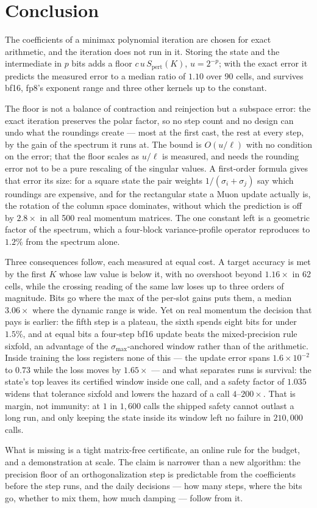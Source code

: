 \section{Conclusion}
\label{sec:conclusion}

The coefficients of a minimax polynomial iteration are chosen for exact arithmetic, and
the iteration does not run in it.  Storing the state and the intermediate in $p$ bits adds
a floor $c\,u\,S_{\mathrm{pert}}(K)$, $u=2^{-p}$; with the exact error it predicts the
measured error to a median ratio of $1.10$ over 90 cells, and survives bf16, fp8's
exponent range and three other kernels up to the constant.

The floor is not a balance of contraction and reinjection but a subspace error: the exact
iteration preserves the polar factor, so no step count and no design can undo what the
roundings create --- most at the first cast, the rest at every step, by the gain of the
spectrum it runs at.  The bound is $O(u/\ell)$ with no condition on the error; that the
floor scales as $u/\ell$ is measured, and needs the rounding error not to be a pure
rescaling of the singular values.  A first-order formula gives that error its size: for a square state the
pair weights $1/(\sigma_i+\sigma_j)$ say which roundings are expensive, and for the
rectangular state a Muon update actually is, the rotation of the column space dominates,
without which the prediction is off by $2.8\times$ in all 500 real momentum matrices.
The one constant left is a geometric factor of the spectrum, which a four-block
variance-profile operator reproduces to $1.2\%$ from the spectrum alone.

Three consequences follow, each measured at equal cost.  A target accuracy is met by the
first $K$ whose law value is below it, with no overshoot beyond $1.16\times$ in 62 cells,
while the crossing reading of the same law loses up to three orders of magnitude.  Bits go
where the max of the per-slot gains puts them, a median $3.06\times$ where the dynamic
range is wide.  Yet on real momentum the decision that pays is earlier: the fifth
step is a plateau, the sixth spends eight bits for under $1.5\%$, and at equal bits a
four-step bf16 update beats the mixed-precision rule sixfold, an advantage of the
$\sigma_{\max}$-anchored window rather than of the arithmetic.  Inside training the loss
registers none of this --- the update error spans $1.6\times10^{-2}$ to $0.73$ while the
loss moves by $1.65\times$ --- and what separates runs is survival: the state's top leaves
its certified window inside one call, and a safety factor of $1.035$ widens that tolerance
sixfold and lowers the hazard of a call $4$--$200\times$.  That is margin, not immunity:
at $1$ in $1{,}600$ calls the shipped safety cannot outlast a long run, and only keeping the
state inside its window left no failure in $210{,}000$ calls.

What is missing is a tight matrix-free certificate, an online rule for the budget, and a
demonstration at scale.  The claim is narrower than a new algorithm: the precision floor of an orthogonalization
step is predictable from the coefficients before the step runs, and the daily decisions
--- how many steps, where the bits go, whether to mix them, how much damping --- follow
from it.
